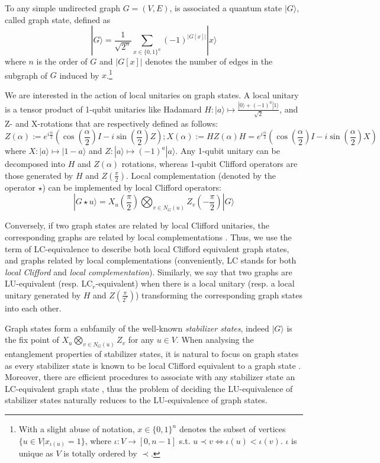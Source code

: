 \documentclass[a4paper,UKenglish,cleveref,autoref,thm-restate]{arxiv}
\newcommand{\ket}[1]{  |{#1} \rangle} %
\renewcommand{\iff}{\Leftrightarrow}
\renewcommand{\iff}{\Leftrightarrow}
\renewcommand{\iff}{\Leftrightarrow}
\begin{document}
To any simple undirected graph $G=(V,E)$, is associated a quantum state $\ket G$, called graph state, defined as $$\ket G = \frac 1{\sqrt {2^n}}\sum_{x\in \{0,1\}^n}(-1)^{|G[x]|}\ket x$$ 
where $n$ is the order of $G$ and $|G[x]|$ denotes the number of edges in the subgraph of $G$ induced by $x$.\footnote{With a slight abuse of notation, $x\in \{0,1\}^n$ denotes the subset of vertices $\{u \in V | x_{\iota(u)} = 1\}$, where $\iota:V\to [0,n-1]$ s.t. $u\prec v\iff \iota(u)<\iota(v)$. $\iota$ is unique as $V$ is totally ordered by $\prec$.}


We are interested in the action of local unitaries on graph states. A local unitary is a tensor product of 1-qubit unitaries like Hadamard $H:\ket{a}\mapsto \frac{\ket 0+(-1)^a\ket1}{\sqrt 2}$, and Z- and X-rotations that are respectively defined as follows:
$$Z(\alpha)\!:=e^{i\frac \alpha2}\left(\cos\left(\frac \alpha2\right)I-i\sin\left(\frac \alpha2\right)Z\right); X(\alpha)\!:=HZ(\alpha)H=e^{i\frac \alpha2}\left(\cos\left(\frac \alpha2\right)I-i\sin\left(\frac \alpha2\right)X\right)$$
where  $X:\ket a\mapsto \ket {1-a}$ and $Z:\ket a \mapsto (-1)^a\ket a$.
Any 1-qubit unitary can be decomposed into $H$ and $Z(\alpha)$ rotations, whereas 1-qubit Clifford operators are those generated by $H$ and $Z(\frac \pi 2)$. Local complementation (denoted by the operator $\star$) can be implemented by local Clifford operators: 
$$\ket{G\star u} = X_u\left(\frac \pi {2}\right)\bigotimes_{v\in N_G(u)}Z_v\left(-\frac \pi {2}\right)\ket{G}$$

Conversely, if two graph states are related by local Clifford unitaries, the corresponding graphs are related by local complementations \cite{VandenNest04}. Thus, we use the term of LC-equivalence to describe both local Clifford equivalent graph states, and graphs related by local complementations (conveniently, LC stands for both \emph{local Clifford} and \emph{local complementation}). Similarly, we say that two graphs are LU-equivalent (resp. LC$_r$-equivalent) when there is a local unitary (resp. a local unitary generated by $H$ and $Z(\frac \pi {2^r})$) transforming the corresponding graph states into each other. 

Graph states form a subfamily of the well-known \emph{stabilizer states}, indeed $\ket G$ is the fix point of $X_u\bigotimes_{v\in N_G(u)}Z_v$ for any $u\in V$. When analysing the entanglement properties of stabilizer states, it is natural to focus on graph states as every stabilizer state is known to be local Clifford equivalent to a graph state \cite{VandenNest04}. Moreover, there are efficient procedures to associate with any stabilizer state an LC-equivalent graph state \cite{VdnEfficientLC}, thus the problem of deciding the LU-equivalence of stabilizer states naturally reduces to the LU-equivalence of graph states. 
\end{document}
